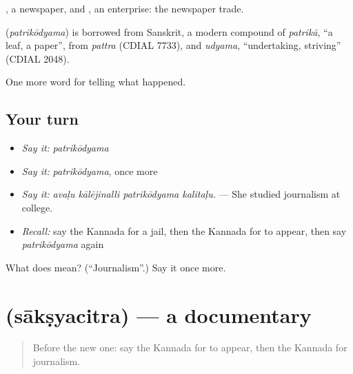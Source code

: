 , a newspaper, and , an enterprise: the newspaper trade.

\begin{cousinweb}
\textbf{} (\emph{patrikōdyama}) is borrowed from Sanskrit, a modern compound of \emph{patrikā}, \textquotedblleft{}a leaf, a paper\textquotedblright{}, from \emph{pattra} (CDIAL 7733), and \emph{udyama}, \textquotedblleft{}undertaking, striving\textquotedblright{} (CDIAL 2048).
\end{cousinweb}

\begin{grammarlens}[title={What you've built}]
One more word for telling what happened.
\end{grammarlens}

\subsection*{Your turn}
\begin{itemize}
\raggedright
  \item \emph{Say it:} \emph{patrikōdyama}
  \item \emph{Say it:} \emph{patrikōdyama}, once more
  \item \emph{Say it:} \emph{avaḷu kālējinalli patrikōdyama kalitaḷu.} — She studied journalism at college.
  \item \emph{Recall:} say the Kannada for a jail, then the Kannada for to appear, then say \emph{patrikōdyama} again
\end{itemize}

\begin{tcolorbox}[breakable,colback=teal!4,colframe=teal!35!black,title={Before you move on}]
What does  mean? (\textquotedblleft{}Journalism\textquotedblright{}.) Say it once more.
\end{tcolorbox}
\section[\texorpdfstring{\kn{ಸಾಕ್ಷ್ಯಚಿತ್ರ} (sākṣyacitra)}{ಸಾಕ್ಷ್ಯಚಿತ್ರ (sākṣyacitra)}]{ (sākṣyacitra) — a documentary}

\label{lesson:KA-C370-saksyacitra}



\begin{quote}
Before the new one: say the Kannada for to appear, then the Kannada for journalism.
\end{quote}

